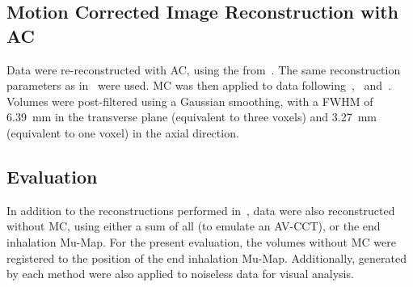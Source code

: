             \subsection{Motion Corrected Image Reconstruction with AC} \label{sec:comparison_of_motion_correction_methods_incorporating_motion_modelling_for_pet/ct_using_a_single_breath_hold_attenuation_map_attenuation_corrected_image_reconstruction}
                Data were re-reconstructed with \gls{AC}, using the  from~. The same reconstruction parameters as in~ were used. \gls{MC} was then applied to data following~,~ and~. Volumes were post-filtered using a Gaussian smoothing, with a \gls{FWHM} of \SI{6.39}{\milli\metre} in the transverse plane (equivalent to three voxels) and \SI{3.27}{\milli\metre} (equivalent to one voxel) in the axial direction.
            
            \subsection{Evaluation} \label{sec:comparison_of_motion_correction_methods_incorporating_motion_modelling_for_pet/ct_using_a_single_breath_hold_attenuation_map_evaluation}
                In addition to the reconstructions performed in~, data were also reconstructed without \gls{MC}, using either a sum of all  (to emulate an \gls{AV-CCT}), or the end inhalation \gls{Mu-Map}. For the present evaluation, the volumes without \gls{MC} were registered to the position of the end inhalation \gls{Mu-Map}. Additionally,  generated by each method were also applied to noiseless data for visual analysis.
                
